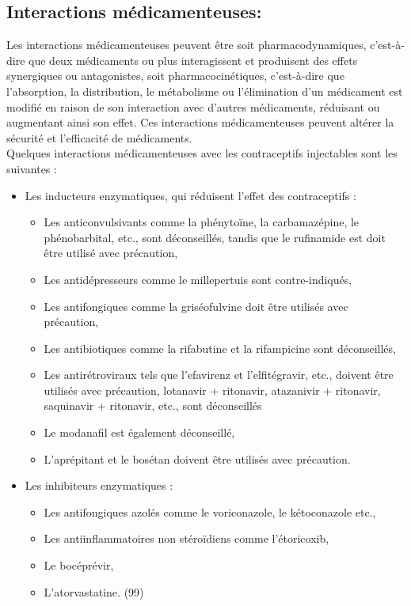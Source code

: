 \subsection{Interactions médicamenteuses: }

Les interactions médicamenteuses peuvent être soit pharmacodynamiques, c’est-à-dire que deux médicaments ou plus interagissent et produisent des effets synergiques ou antagonistes, soit pharmacocinétiques, c’est-à-dire que l’absorption, la distribution, le métabolisme ou l’élimination d’un médicament est modifié en raison de son interaction avec d’autres médicaments, réduisant ou augmentant ainsi son effet. Ces interactions médicamenteuses peuvent altérer la sécurité et l’efficacité de médicaments. \\

\noindent Quelques interactions médicamenteuses avec les contraceptifs injectables sont les suivantes : 

\begin{itemize}[label={$\Rightarrow$}, align=right]
  \item Les inducteurs enzymatiques, qui réduisent l’effet des contraceptifs : 
  \begin{itemize}[label={$\bullet$}, nosep]
    \item Les anticonvulsivants comme la phénytoïne, la carbamazépine, le phénobarbital, etc., sont déconseillés, tandis que le rufinamide est doit être utilisé avec précaution,
    \item Les antidépresseurs comme le millepertuis sont contre-indiqués, 
    \item Les antifongiques comme la griséofulvine doit être utilisés avec précaution,
    \item Les antibiotiques comme la rifabutine et la rifampicine sont déconseillés, 
    \item Les antirétroviraux tels que l’efavirenz et l’elfitégravir, etc., doivent être utilisés avec précaution, lotanavir + ritonavir, atazanivir + ritonavir, saquinavir + ritonavir, etc., sont déconseillés
    \item Le modanafil est également déconseillé,
    \item L’aprépitant et le bosétan doivent être utilisés avec précaution. 
  \end{itemize}

  \item Les inhibiteurs enzymatiques :
  \begin{itemize}[label={$\bullet$}, nosep]    
    \item Les antifongiques azolés comme le voriconazole, le kétoconazole etc., 
    \item Les antiinflammatoires non stéroïdiens comme l’étoricoxib, 
    \item Le bocéprévir, 
    \item L’atorvastatine. (99)
  \end{itemize}
\end{itemize}


